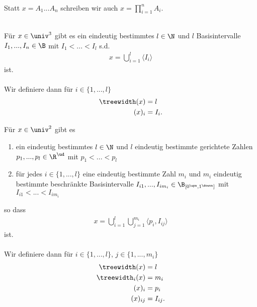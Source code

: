 \begin{nota}[Konkatenation]\ \\
    Statt $x = A_1 ... A_n$ schreiben wir auch $x = \prod\limits_{i=1}^n A_i$.
\end{nota}


\begin{satzdef}\ \\
    Für $x \in \univ^3$ gibt es ein eindeutig bestimmtes $l \in \N$ und $l$ Basisintervalle $I_1, ..., I_n \in \B$ mit $I_1 < ... < I_l$ s.d.
    \begin{align*}
        x = \bigcup_{i=1}^l \langle I_i \rangle
    \end{align*}
    ist.\\ \ \\
    Wir definiere dann für $i \in \{1, ..., l\}$
    \begin{align*}
        \treewidth(x) &= l\\
        (x)_i &= I_i.
    \end{align*}
\end{satzdef}

\begin{satzdef}
    Für $x \in \univ^2$ gibt es
    \begin{enumerate}
        \item ein eindeutig bestimmtes $l \in \N$ und $l$ eindeutig bestimmte gerichtete Zahlen $p_1, ..., p_l \in \R^\ud$ mit $p_1 < ... < p_l$
        \item für jedes $i \in \{1, ..., l\}$ eine eindeutig bestimmte Zahl $m_i$ und $m_i$ eindeutig bestimmte beschränkte Basisintervalle $I_{i1}, ..., I_{im_i} \in \B_{[0^\upa, 1^\downa]}$ mit $I_{i1} < ... < I_{im_i}$
    \end{enumerate}
    so dass
    \begin{align*}
        x = \bigcup_{i=1}^l \bigcup_{j=1}^{m_i} \langle p_i, I_{ij} \rangle
    \end{align*}
    ist.\\ \ \\
    Wir definiere dann für $i \in \{1, ..., l\}$, $j \in \{1, ..., m_i\}$
    \begin{align*}
        \treewidth(x) &= l\\
        \treewidth_i(x) &= m_i\\
        (x)_i &= p_i\\
        (x)_{ij} &= I_{ij}.
    \end{align*}
\end{satzdef}

